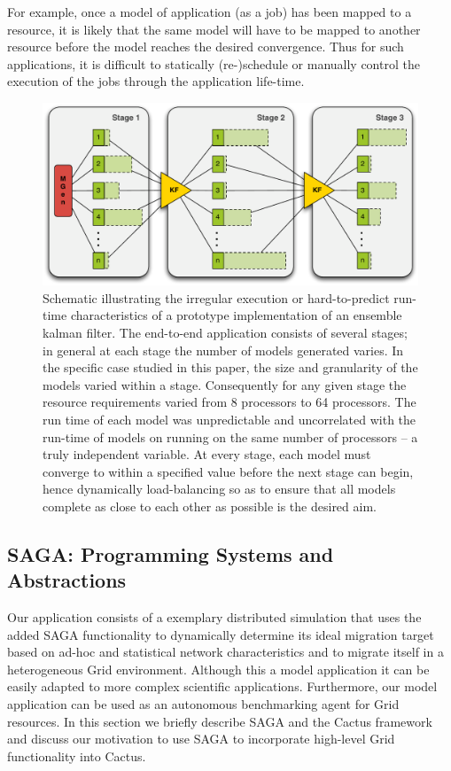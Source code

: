 \documentclass[conference,final]{IEEEtran}
\begin{document}
For example, once a model of application (as a job) has been mapped to
a resource, it is likely that the same model will have to be mapped to
another resource before the model reaches the desired convergence.
Thus for such applications, it is difficult to statically
(re-)schedule or manually control the execution of the jobs through
the application life-time.

\begin{figure}
\begin{center}
\includegraphics*[scale=0.36,]{./figures/3StageKalmanFilter}
\end{center}
\caption{Schematic illustrating the irregular execution or
  hard-to-predict run-time characteristics of a prototype
  implementation of an ensemble kalman filter. The end-to-end
  application consists of several stages; in general at each stage the
  number of models generated varies. In the specific case studied in
  this paper, the size and granularity of the models varied within a
  stage. Consequently for any given stage the resource requirements
  varied from 8 processors to 64 processors.  The run time of each
  model was unpredictable and uncorrelated with the run-time of models
  on running on the same number of processors -- a truly independent
  variable. At every stage, each model must converge to within a
  specified value before the next stage can begin, hence dynamically
  load-balancing so as to ensure that all models complete as close to
  each other as possible is the desired aim.}
\label{fig:irregular_execution}
\end{figure}

\subsection{SAGA: Programming Systems and Abstractions}

Our application consists of a exemplary distributed simulation that
uses the added SAGA functionality to dynamically determine its ideal
migration target based on ad-hoc and statistical network
characteristics and to migrate itself in a heterogeneous Grid
environment.  Although this a model application it can be easily
adapted to more complex scientific applications.  Furthermore, our
model application can be used as an autonomous benchmarking agent for
Grid resources. In this section we briefly describe SAGA and the
Cactus framework and discuss our motivation to use SAGA to incorporate
high-level Grid functionality into Cactus.
\end{document}
